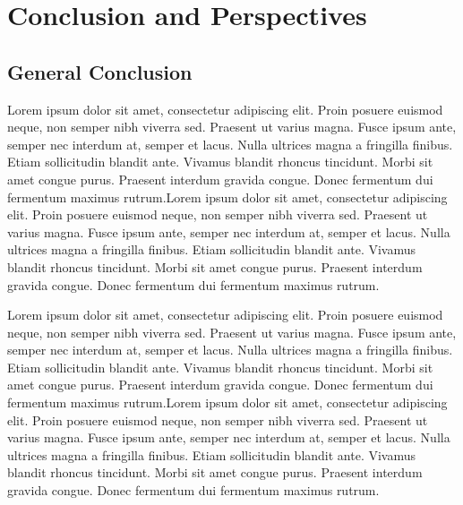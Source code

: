 \chapter*{Conclusion and Perspectives}
\label{sec:conclusion}

\clearpage

\section*{General Conclusion}

    Lorem ipsum dolor sit amet, consectetur adipiscing elit. Proin posuere euismod neque, non semper nibh viverra sed. Praesent ut varius magna. Fusce ipsum ante, semper nec interdum at, semper et lacus. Nulla ultrices magna a fringilla finibus. Etiam sollicitudin blandit ante. Vivamus blandit rhoncus tincidunt. Morbi sit amet congue purus. Praesent interdum gravida congue. Donec fermentum dui fermentum maximus rutrum.Lorem ipsum dolor sit amet, consectetur adipiscing elit. Proin posuere euismod neque, non semper nibh viverra sed. Praesent ut varius magna. Fusce ipsum ante, semper nec interdum at, semper et lacus. Nulla ultrices magna a fringilla finibus. Etiam sollicitudin blandit ante. Vivamus blandit rhoncus tincidunt. Morbi sit amet congue purus. Praesent interdum gravida congue. Donec fermentum dui fermentum maximus rutrum.
    
    \medskip
    
    Lorem ipsum dolor sit amet, consectetur adipiscing elit. Proin posuere euismod neque, non semper nibh viverra sed. Praesent ut varius magna. Fusce ipsum ante, semper nec interdum at, semper et lacus. Nulla ultrices magna a fringilla finibus. Etiam sollicitudin blandit ante. Vivamus blandit rhoncus tincidunt. Morbi sit amet congue purus. Praesent interdum gravida congue. Donec fermentum dui fermentum maximus rutrum.Lorem ipsum dolor sit amet, consectetur adipiscing elit. Proin posuere euismod neque, non semper nibh viverra sed. Praesent ut varius magna. Fusce ipsum ante, semper nec interdum at, semper et lacus. Nulla ultrices magna a fringilla finibus. Etiam sollicitudin blandit ante. Vivamus blandit rhoncus tincidunt. Morbi sit amet congue purus. Praesent interdum gravida congue. Donec fermentum dui fermentum maximus rutrum.
    
    \medskip
    

